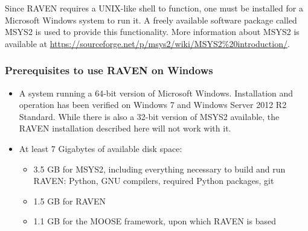 Since RAVEN requires a UNIX-like shell to function, one must be installed for a Microsoft
Windows system to run it.  A freely available software package called MSYS2 is used to
provide this functionality.  More information about MSYS2 is available at
\url{https://sourceforge.net/p/msys2/wiki/MSYS2%20introduction/}.

\subsubsection{Prerequisites to use RAVEN on Windows}
\begin{itemize}
    \item A system running a 64-bit version of Microsoft Windows. Installation and operation
        has been verified on Windows 7 and Windows Server 2012 R2 Standard. While there
        is also a 32-bit version of MSYS2 available, the RAVEN installation described here will not work with it.
    \item At least 7 Gigabytes of available disk space:
    \begin{itemize}
        \item 3.5 GB for MSYS2, including everything necessary to build and run RAVEN: Python, GNU compilers, required Python packages, git
        \item 1.5 GB for RAVEN
        \item 1.1 GB for the MOOSE framework, upon which RAVEN is based
    \end{itemize}
\end{itemize}

